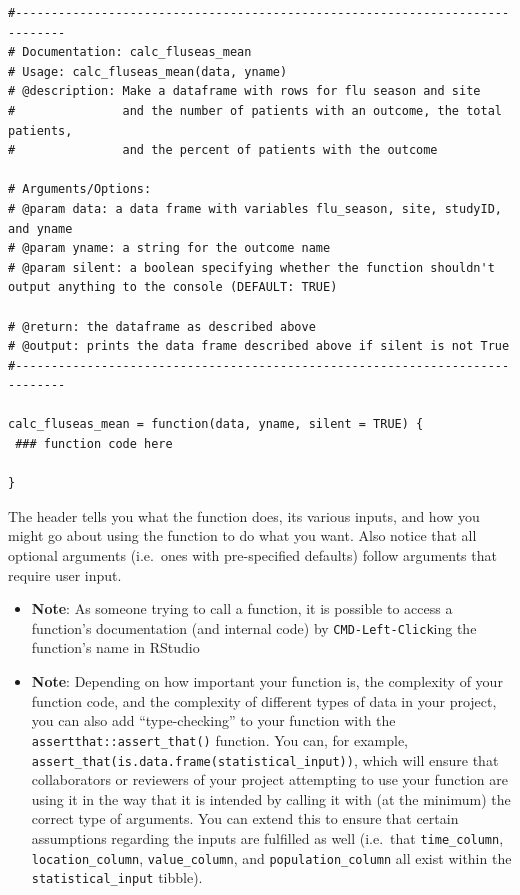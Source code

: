 \documentclass[
]{book}
\begin{document}
\begin{verbatim}
#-----------------------------------------------------------------------------
# Documentation: calc_fluseas_mean
# Usage: calc_fluseas_mean(data, yname)
# @description: Make a dataframe with rows for flu season and site
#               and the number of patients with an outcome, the total patients,
#               and the percent of patients with the outcome

# Arguments/Options:
# @param data: a data frame with variables flu_season, site, studyID, and yname
# @param yname: a string for the outcome name
# @param silent: a boolean specifying whether the function shouldn't output anything to the console (DEFAULT: TRUE)

# @return: the dataframe as described above
# @output: prints the data frame described above if silent is not True
#-----------------------------------------------------------------------------

calc_fluseas_mean = function(data, yname, silent = TRUE) {
 ### function code here 

}
\end{verbatim}

The header tells you what the function does, its various inputs, and how you might go about using the function to do what you want. Also notice that all optional arguments (i.e.~ones with pre-specified defaults) follow arguments that require user input.

\begin{itemize}
\item
  \textbf{Note}: As someone trying to call a function, it is possible to access a function's documentation (and internal code) by \texttt{CMD-Left-Click}ing the function's name in RStudio
\item
  \textbf{Note}: Depending on how important your function is, the complexity of your function code, and the complexity of different types of data in your project, you can also add ``type-checking'' to your function with the \texttt{assertthat::assert\_that()} function. You can, for example, \texttt{assert\_that(is.data.frame(statistical\_input))}, which will ensure that collaborators or reviewers of your project attempting to use your function are using it in the way that it is intended by calling it with (at the minimum) the correct type of arguments. You can extend this to ensure that certain assumptions regarding the inputs are fulfilled as well (i.e.~that \texttt{time\_column}, \texttt{location\_column}, \texttt{value\_column}, and \texttt{population\_column} all exist within the \texttt{statistical\_input} tibble).
\end{itemize}
\end{document}

